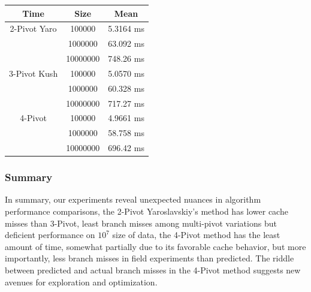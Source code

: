 \documentclass[a4paper,oneside,12pt]{book}
\begin{document}
\begin{center}
\small
\begin{tabular}{ |c c | c | }
    \hline
    Time            & Size     & Mean         \\
    \hline
    2-Pivot Yaro    & 100000   & 5.3164 ms    \\
                    & 1000000  & 63.092 ms    \\
                    & 10000000 & 748.26 ms    \\

    \hline
    3-Pivot Kush    & 100000   & 5.0570 ms    \\
                    & 1000000  & 60.328 ms    \\
                    & 10000000 & 717.27 ms    \\
    \hline
    4-Pivot         & 100000   & 4.9661 ms    \\
                    & 1000000  & 58.758 ms    \\
                    & 10000000 & 696.42 ms    \\
    \hline
\end{tabular}
\end{center}

\subsubsection{Summary}
In summary, our experiments reveal unexpected nuances in algorithm performance comparisons, the 2-Pivot Yaroslavskiy's method has lower cache misses than 3-Pivot, least branch misses among multi-pivot variations but deficient performance on $10^7$ size of data, the 4-Pivot method has the least amount of time,
somewhat partially due to its favorable cache behavior, but more importantly, less branch misses in field experiments than predicted. The riddle between predicted and actual branch misses in the 4-Pivot method suggests new avenues for exploration and optimization.

\end{document}
